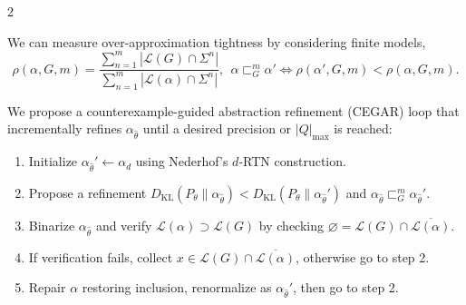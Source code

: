 \documentclass[portrait,a0b,final,a4resizeable]{a0poster}
\begin{document}
\begin{poster}
\begin{multicols}{2}
    \vspace{0.7em}\hspace{0.5cm}
  \begin{minipage}[t]{0.35\linewidth}
    \centering
    \resizebox{0.9\linewidth}{!}{}
  \end{minipage}
  \hspace{0.1cm}
  \begin{minipage}[t]{0.52\linewidth}
    \centering
    \resizebox{1.2\linewidth}{!}{}  \end{minipage}
  \vspace{0.3em}

    \null\hspace*{2.8cm}\begin{minipage}[c]{0.86\columnwidth}
  We can measure over-approximation tightness by considering finite models,\\
    \[
      \rho(\alpha, G, m) =
      \frac{\sum_{n=1}^m |\mathcal{L}(G)\cap\Sigma^n|}
      {\sum_{n=1}^m |\mathcal{L}(\alpha)\cap\Sigma^n|},
      \:\:\alpha \sqsubset_G^m \alpha'
      \iff
      \rho(\alpha',G,m) < \rho(\alpha,G,m).
    \]
  \end{minipage}
    \vspace{0.7em}


    \null\hspace*{2.8cm}\begin{minipage}[c]{0.86\columnwidth}
    We propose a counterexample-guided abstraction refinement (CEGAR) loop that incrementally refines $\alpha_{\hat\theta}$ until a desired precision or $|Q|_\max$ is reached:\vspace{0.4cm}
    \end{minipage}

    \begin{enumerate}
      \itemsep0em
      \itemindent=4cm
      \sloppy
      \setlength{\emergencystretch}{5cm}
      \item \phantom{.}Initialize $\alpha_{\hat\theta}'\leftarrow \alpha_d$ using Nederhof's $d$-RTN construction.
      \item \phantom{.}Propose a refinement $D_\text{KL}(P_{\theta}\|\alpha_{\hat\theta}) < D_\text{KL}(P_{\theta}\|\alpha_{\hat\theta}')$ and $\alpha_{\hat\theta} \sqsubset_G^m \alpha_{\hat\theta}'$.
      \item \phantom{.}Binarize $\alpha_\hat\theta$ and verify $\mathcal{L}(\alpha) \supset \mathcal{L}(G)$ by checking $\varnothing =\mathcal{L}(G)\cap \overline{\mathcal{L}(\alpha)}$.
      \item \phantom{.}If verification fails, collect $x \in \mathcal{L}(G)\cap \overline{\mathcal{L}(\alpha)}$, otherwise go to step 2.
      \item \phantom{.}Repair $\alpha$ restoring inclusion, renormalize as $\alpha_{\hat\theta}'$, then go to step 2.
    \end{enumerate}


\end{multicols}
\end{poster}
\end{document}
